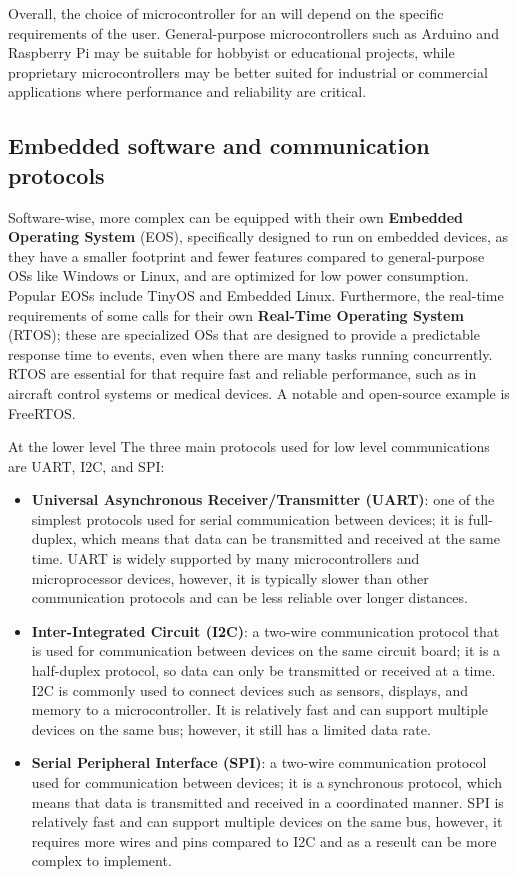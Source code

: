 Overall, the choice of microcontroller for an \es will depend on the specific requirements of the user. General-purpose microcontrollers such as Arduino and Raspberry Pi may be suitable for hobbyist or educational projects, while proprietary microcontrollers may be better suited for industrial or commercial applications where performance and reliability are critical.


\subsection{Embedded software and communication protocols}
Software-wise, more complex \ess can be equipped with their own \textbf{Embedded Operating System} (EOS), specifically designed to run on embedded devices, as they have a smaller footprint and fewer features compared to general-purpose OSs like Windows or Linux, and are optimized  for low power consumption. Popular EOSs include TinyOS and Embedded Linux.
Furthermore, the real-time requirements of some \ess calls for their own \textbf{Real-Time Operating System} (RTOS); these are specialized OSs that are designed to provide a predictable response time to events, even when there are many tasks running concurrently. RTOS are essential for \es that require fast and reliable performance, such as in aircraft control systems or medical devices. A notable and open-source example is FreeRTOS. 


At the lower level 
The three main protocols used for low level communications are UART, I2C, and SPI:
\begin{itemize}
    \item \textbf{Universal Asynchronous Receiver/Transmitter (UART)}: one of the simplest protocols used for serial communication between devices; it is full-duplex, which means that data can be transmitted and received at the same time. UART is widely supported by many microcontrollers and microprocessor devices, however, it is typically slower than other communication protocols and can be less reliable over longer distances.
    \item \textbf{Inter-Integrated Circuit (I2C)}: a two-wire communication protocol that is used for communication between devices on the same circuit board; it is a half-duplex protocol, so data can only be transmitted or received at a time. I2C is commonly used to connect devices such as sensors, displays, and memory to a microcontroller. It is relatively fast and can support multiple devices on the same bus; however, it still has a limited data rate.
    \item \textbf{Serial Peripheral Interface (SPI)}: a two-wire communication protocol used for communication between devices; it is a synchronous protocol, which means that data is transmitted and received in a coordinated manner. SPI is relatively fast and can support multiple devices on the same bus, however, it requires more wires and pins compared to I2C and as a reseult can be more complex to implement.
\end{itemize} 



